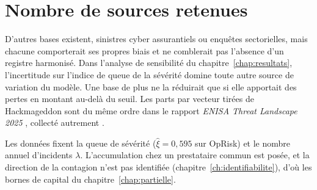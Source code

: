 
\section{Nombre de sources retenues}

D'autres bases existent, sinistres cyber assurantiels ou enquêtes sectorielles, mais chacune
comporterait ses propres biais et ne comblerait pas l'absence d'un registre harmonisé. Dans l'analyse de sensibilité du chapitre~\ref{chap:resultats}, l'incertitude sur l'indice de queue de la sévérité domine toute autre source de variation du modèle. Une base de plus ne la réduirait que si elle apportait des pertes en montant au-delà du seuil. Les parts par vecteur tirées de
Hackmageddon sont du même ordre dans le rapport \emph{ENISA Threat Landscape 2025} \citep{enisa2025}, collecté autrement \matcomp.

Les données fixent la queue de sévérité ($\hat\xi = 0{,}595$ sur OpRisk) et le nombre annuel d'incidents $\lambda$. L'accumulation chez un prestataire commun est posée, et la direction de la contagion n'est pas identifiée (chapitre~\ref{ch:identifiabilite}), d'où les bornes de capital du chapitre~\ref{chap:partielle}.

